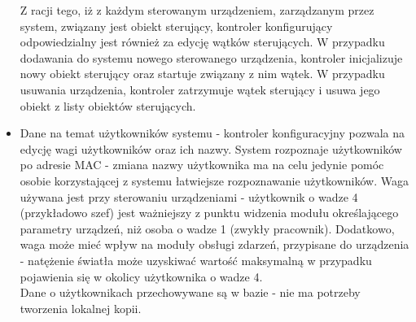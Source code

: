 \begin{itemize}
	Z racji tego, iż z każdym sterowanym urządzeniem, zarządzanym przez system, związany jest obiekt sterujący, kontroler konfigurujący odpowiedzialny jest również za edycję wątków sterujących. W przypadku dodawania do systemu nowego sterowanego urządzenia, kontroler inicjalizuje nowy obiekt sterujący oraz startuje związany z nim wątek. W przypadku usuwania urządzenia, kontroler zatrzymuje wątek sterujący i usuwa jego obiekt z listy obiektów sterujących.
	\item Dane na temat użytkowników systemu - kontroler konfiguracyjny pozwala na edycję wagi użytkowników oraz ich nazwy. System rozpoznaje użytkowników po adresie MAC - zmiana nazwy użytkownika ma na celu jedynie pomóc osobie korzystającej z systemu łatwiejsze rozpoznawanie użytkowników. Waga używana jest przy sterowaniu urządzeniami - użytkownik o wadze 4 (przykładowo szef) jest ważniejszy z punktu widzenia modułu określającego parametry urządzeń, niż osoba o wadze 1 (zwykły pracownik). Dodatkowo, waga może mieć wpływ na moduły obsługi zdarzeń, przypisane do urządzenia - natężenie światła może uzyskiwać wartość maksymalną w przypadku pojawienia się w okolicy użytkownika o wadze 4.\\
	Dane o użytkownikach przechowywane są w bazie - nie ma potrzeby tworzenia lokalnej kopii.
\end{itemize}
